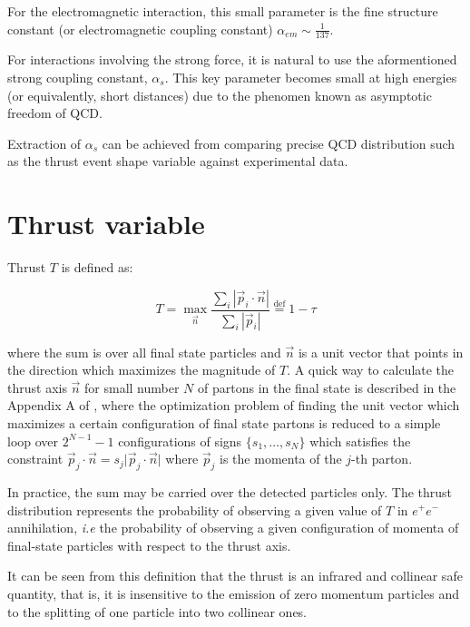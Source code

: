 \documentclass[../main.tex]{subfiles}
\begin{document}
For the electromagnetic interaction, this small parameter is the fine structure constant (or electromagnetic coupling constant) $\alpha_{em} \sim \frac{1}{137}$.

For interactions involving the strong force, it is natural to use the aformentioned strong coupling constant, $\alpha_s$. This key parameter becomes small 
at high energies (or equivalently, short distances) due to the phenomen known as asymptotic freedom of QCD.

Extraction of $\alpha_s$ can be achieved from comparing precise QCD distribution such as the thrust event shape variable against experimental data. 


\section{Thrust variable}\label{sec:Thrust}

Thrust $T$ is defined as:

\begin{equation} \label{eq:Thrust}
    T = \max_{\vec{n}} \frac{\sum_i |\vec{p}_i \cdot \vec{n}|}{\sum_i |\vec{p}_i|} \stackrel{\text{def}}{=} 1-\tau
\end{equation}

where the sum is over all final state particles and $\vec{n}$ is a unit vector that points in the direction
which maximizes the magnitude of $T$. A quick way to calculate the thrust axis $\vec{n}$ for small number $N$ of partons in the final state is described 
in the Appendix A of \cite{Weinzierl_2009}, where the optimization problem of finding the unit vector which maximizes a certain configuration of final state partons 
is reduced to a simple loop over $2^{N-1}-1$ configurations of signs $\{s_1,\dots,s_N\}$ which satisfies the constraint
$ \vec{p}_j\cdot \vec{n} = s_j \vert \vec{p}_j\cdot \vec{n} \vert $ where $\vec{p}_j$ is the momenta of the $j$-th parton.

In practice, the sum may be carried over the detected particles only.  
The thrust distribution represents the probability of observing a given value of $T$ in $e^+e^-$ annihilation, \emph{i.e} the probability of observing a given configuration of momenta of final-state particles 
with respect to the thrust axis.

It can be seen from this definition that the thrust is an infrared and collinear safe quantity, that is, it is insensitive to the emission of zero momentum particles and to the splitting of 
one particle into two collinear ones.
\end{document}
